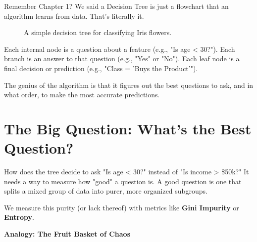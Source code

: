 \documentclass[11pt, letterpaper, openany]{book}
\begin{document}
Remember Chapter 1? We said a Decision Tree is just a flowchart that an algorithm learns from data. That's literally it.

\begin{figure}[h!]
\centering
{}
\caption{A simple decision tree for classifying Iris flowers.}
\end{figure}

Each internal node is a question about a feature (e.g., "Is age < 30?").
Each branch is an answer to that question (e.g., "Yes" or "No").
Each leaf node is a final decision or prediction (e.g., "Class = 'Buys the Product'").

The genius of the algorithm is that it figures out the best questions to ask, and in what order, to make the most accurate predictions.

\section{The Big Question: What's the Best Question?}

How does the tree decide to ask "Is age < 30?" instead of "Is income > \$50k?" It needs a way to measure how "good" a question is. A good question is one that splits a mixed group of data into purer, more organized subgroups.

We measure this purity (or lack thereof) with metrics like \textbf{Gini Impurity} or \textbf{Entropy}.

\textbf{Analogy: The Fruit Basket of Chaos}
\end{document}
